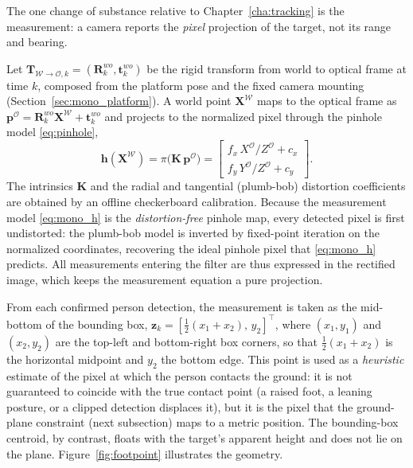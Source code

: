 The one change of substance relative
to Chapter~\ref{cha:tracking} is the measurement: a camera reports the
\emph{pixel} projection of the target, not its range and bearing.

Let $\bm{T}_{\mathcal{W}\to\mathcal{O},k}=(\bm{R}^{wo}_k,\bm{t}^{wo}_k)$ be the
rigid transform from world to optical frame at time $k$, composed from the
platform pose and the fixed camera mounting (Section~\ref{sec:mono_platform}). A
world point $\bm{X}^{\mathcal{W}}$ maps to the optical frame as
$\bm{p}^{\mathcal{O}}=\bm{R}^{wo}_k\bm{X}^{\mathcal{W}}+\bm{t}^{wo}_k$ and projects
to the normalized pixel through the pinhole model \eqref{eq:pinhole},
\begin{equation}
  \bm{h}(\bm{X}^{\mathcal{W}}) = \pi\!\big(\bm{K}\,\bm{p}^{\mathcal{O}}\big)
  = \begin{bmatrix} f_x\,X^{\mathcal{O}}/Z^{\mathcal{O}} + c_x \\[2pt]
                    f_y\,Y^{\mathcal{O}}/Z^{\mathcal{O}} + c_y \end{bmatrix}.
  \label{eq:mono_h}
\end{equation}
The intrinsics $\bm{K}$ and the radial and tangential (plumb-bob) distortion
coefficients are obtained by an offline checkerboard calibration. Because the measurement model \eqref{eq:mono_h} is the
\emph{distortion-free} pinhole map, every detected pixel is first undistorted: the
plumb-bob model is inverted by fixed-point iteration on the normalized
coordinates, recovering the ideal pinhole pixel that \eqref{eq:mono_h} predicts.
All measurements entering the filter are thus expressed in the rectified image,
which keeps the measurement equation a pure projection.

From each confirmed person detection, the measurement is taken as the mid-bottom
of the bounding box,
$\bm{z}_k=[\tfrac{1}{2}(x_1+x_2),\,y_2]^{\top}$, where $(x_1,y_1)$ and $(x_2,y_2)$
are the top-left and bottom-right box corners, so that $\tfrac{1}{2}(x_1+x_2)$ is
the horizontal midpoint and $y_2$ the bottom edge. This point is used as a
\emph{heuristic} estimate of the pixel at which the person contacts the ground:
it is not guaranteed to coincide with the true contact point (a raised foot, a
leaning posture, or a clipped detection displaces it), but it is the pixel that
the ground-plane constraint (next subsection) maps to a metric position. The
bounding-box centroid, by contrast, floats with the target's apparent height and
does not lie on the plane. Figure~\ref{fig:footpoint} illustrates the geometry.

